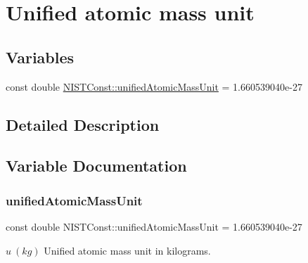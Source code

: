 \hypertarget{group___n_i_s_t_const-_unified_atomic_mass_unit}{}\section{Unified atomic mass unit}
\label{group___n_i_s_t_const-_unified_atomic_mass_unit}
\subsection*{Variables}
\begin{DoxyCompactItemize}
\item 
const double \hyperlink{group___n_i_s_t_const-_unified_atomic_mass_unit_ga5dbf5ee7e0ef084434d647e917855f39}{N\+I\+S\+T\+Const\+::unified\+Atomic\+Mass\+Unit} = 1.\+660539040e-\/27
\end{DoxyCompactItemize}


\subsection{Detailed Description}


\subsection{Variable Documentation}
\mbox{\label{group___n_i_s_t_const-_unified_atomic_mass_unit_ga5dbf5ee7e0ef084434d647e917855f39}} 
\subsubsection{\texorpdfstring{unified\+Atomic\+Mass\+Unit}{unifiedAtomicMassUnit}}
{\footnotesize\ttfamily const double N\+I\+S\+T\+Const\+::unified\+Atomic\+Mass\+Unit = 1.\+660539040e-\/27}

$u \ (kg)$ Unified atomic mass unit in kilograms. 